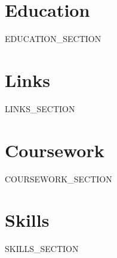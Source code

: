 \documentclass[]{deedy-resume-openfont}
\begin{document}
\lastupdated



\begin{minipage}[t]{0.33\textwidth}


\section{Education}

{{EDUCATION_SECTION}}


\section{Links}
{{LINKS_SECTION}}


\section{Coursework}
{{COURSEWORK_SECTION}}


\section{Skills}
{{SKILLS_SECTION}}


\end{minipage}
\hfill
\end{document}
